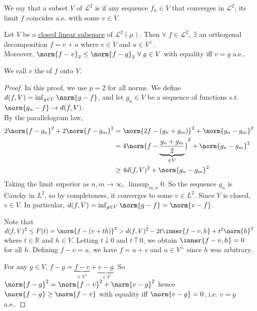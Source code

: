 \begin{definition}
	We say that a subset $V$ of $\mathcal L^2$ is  if any sequence $f_n \in V$ that converges in $\mathcal L^2$, its limit $f$ coincides a.e. with some $v \in V$.
\end{definition}

\begin{theorem}
	Let $V$ be a \underline{closed linear subspace} of $\mathcal L^2(\mu)$.
	Then $\forall \; f \in \mathcal L^2$, $\exists$ an orthogonal decomposition $f = v + u$ where $v \in V$ and $u \in V^\perp$. \\
	Moreover, $\norm{f - v}_2 \leq \norm{f - g}_2 \ \forall \; g \in V$ with equality iff $v = g$ a.e..
\end{theorem}

\begin{definition}[Projection]
	We call $v$ the  of $f$ onto $V$.
\end{definition}

\begin{proof}
	In this proof, we use $p = 2$ for all norms.
	We define $d(f,V) = \inf_{g \in V} \norm{g - f}$, and let $g_n \in V$ be a sequence of functions s.t. $\norm{g_n - f} \to d(f,V)$. \\
	By the parallelogram law,
	\begin{align*}
		2\norm{f - g_n}^2 + 2\norm{f - g_m}^2 &= \norm{2f - (g_n + g_m)}^2 + \norm{g_n - g_m}^2 \\
		&= 4 \norm{f - \underbrace{\frac{g_n + g_m}{2}}_{\in V}}^2 + \norm{g_n - g_m}^2 \\
		&\geq 4 d(f,V)^2 + \norm{g_n - g_m}^2
	\end{align*}
	Taking the limit superior as $n, m \to \infty$, $\limsup_{m,n} 0$.
	So the sequence $g_n$ is Cauchy in $L^2$, so by completeness, it converges to some $v \in L^2$.
	Since $V$ is closed, $v \in V$.
	In particular, $d(f,V) = \inf_{g \in V} \norm{g - f} = \norm{v - f}$.

	Note that $d(f,V)^2 \leq F(t) = \norm{f - (v+th)}^2 > d(f, V)^2 - 2t \inner{f-v, h} + t^2 \norm{h}^2$ where $t \in \mathbb R$ and $h \in V$.
	Letting $t \downarrow 0$ and $t \uparrow 0$, we obtain $\inner{f - v, h} = 0$ for all $h$.
	Defining $f - v = u$, we have $f = u + v$ and $u \in V^\perp$ since $h$ was arbitrary.

	For any $g \in V$, $f - g = \underbrace{f-v}_{\in V^\perp} + \underbrace{v - g}_{\in V}$.
	So $\norm{f - g}^2 = \norm{f - v}^2 + \norm{v - g}^2$ hence $\norm{f - g} \geq \norm{f - v}$ with equality iff $\norm{v - g} = 0$, i.e. $v = g$ a.e..

\end{proof}

